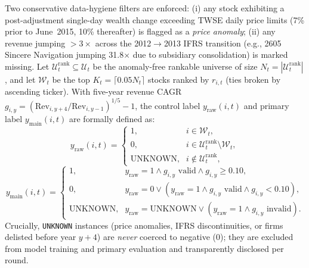 \documentclass[conference]{IEEEtran}
\begin{document}
Two conservative data-hygiene filters are enforced: (i) any stock exhibiting a post-adjustment single-day wealth change exceeding TWSE daily price limits (7\% prior to June~2015, 10\% thereafter) is flagged as a \emph{price anomaly}; (ii) any revenue jumping $> 3\times$ across the 2012$\to$2013 IFRS transition (e.g., 2605 Sincere Navigation jumping 31.8$\times$ due to subsidiary consolidation) is marked missing. Let $\mathcal{U}_t^{\text{rank}} \subseteq \mathcal{U}_t$ be the anomaly-free rankable universe of size $N_t = |\mathcal{U}_t^{\text{rank}}|$, and let $\mathcal{W}_t$ be the top $K_t = \lceil 0.05 N_t \rceil$ stocks ranked by $r_{i,t}$ (ties broken by ascending ticker). With five-year revenue CAGR $g_{i,y} = (\text{Rev}_{i, y+4} / \text{Rev}_{i, y-1})^{1/5} - 1$, the control label $y_{\text{raw}}(i,t)$ and primary label $y_{\text{main}}(i,t)$ are formally defined as:
\begin{equation}
\label{eq:yraw}
y_{\text{raw}}(i,t) = \begin{cases}
1, & i \in \mathcal{W}_t, \\
0, & i \in \mathcal{U}_t^{\text{rank}} \setminus \mathcal{W}_t, \\
\text{UNKNOWN}, & i \notin \mathcal{U}_t^{\text{rank}},
\end{cases}
\end{equation}
\begin{equation}
\label{eq:ymain}
y_{\text{main}}(i,t) = \begin{cases}
1, & y_{\text{raw}}=1 \wedge g_{i,y}\text{ valid} \wedge g_{i,y} \ge 0.10, \\
0, & y_{\text{raw}}=0 \vee (y_{\text{raw}}=1 \wedge g_{i,y}\text{ valid} \wedge g_{i,y} < 0.10), \\
\text{UNKNOWN}, & y_{\text{raw}}=\text{UNKNOWN} \vee (y_{\text{raw}}=1 \wedge g_{i,y}\text{ invalid}).
\end{cases}
\end{equation}
Crucially, \texttt{UNKNOWN} instances (price anomalies, IFRS discontinuities, or firms delisted before year $y+4$) are \emph{never} coerced to negative ($0$); they are excluded from model training and primary evaluation and transparently disclosed per round.
\end{document}
